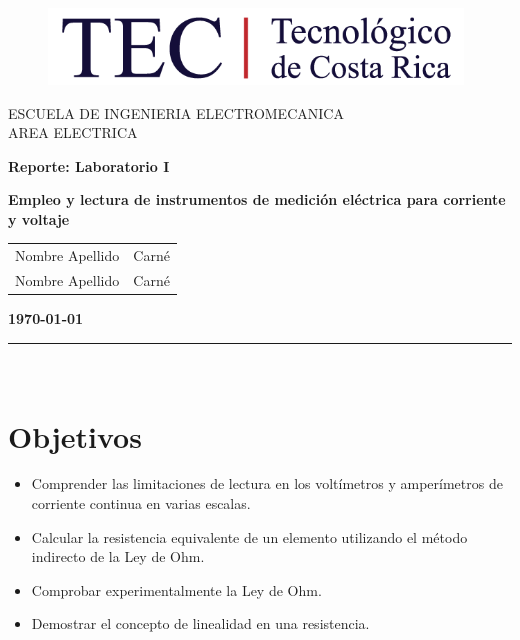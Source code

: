 \documentclass[12pt,letterpaper]{article}
\newcommand{\obj}{Objetivos}
\begin{document}
\begin{titlepage}

\begin{center}
\vspace*{-0.5in}
\begin{figure}[htb]
\begin{center}
\includegraphics[width=11cm]{logo}
\end{center}
\end{figure}
\vspace*{0.4in}
\begin{Large}
ESCUELA DE INGENIERIA ELECTROMECANICA\\
\vspace*{0.15in}
AREA ELECTRICA\\
\vspace*{0.8in}
\end{Large}
\vspace*{0.2in}
\begin{Large}
\textbf{Reporte: Laboratorio I} \\
\end{Large}
\textbf{Empleo y lectura de instrumentos de medición eléctrica para corriente y voltaje}
\vspace*{0.3in}\\
\begin{center}
    \begin{tabular}{c|c}
        Nombre Apellido & Carné  \\
        Nombre Apellido & Carné
    \end{tabular}
\end{center}
\vspace*{2.5in}
\begin{Large}
\textbf{\today}\\
\end{Large}
\rule{80mm}{0.1mm}\\
\vspace*{0.1in}
\end{center}

\end{titlepage}

\tableofcontents
\newpage

\section{\obj}
\begin{itemize}
\item Comprender las limitaciones de lectura en los voltímetros y amperímetros de corriente continua en varias escalas.
\item Calcular la resistencia equivalente de un elemento utilizando el método indirecto de la Ley de Ohm.
\item	Comprobar experimentalmente la Ley de Ohm.
\item	Demostrar el concepto de linealidad en una resistencia.
\end{itemize}
\end{document}
